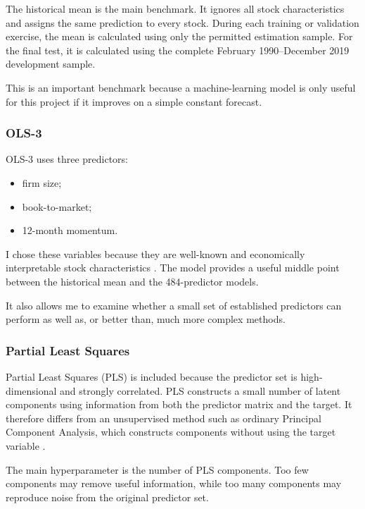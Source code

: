 \documentclass[11pt,a4paper]{article}
\begin{document}
The historical mean is the main benchmark. It ignores all stock
characteristics and assigns the same prediction to every stock. During each
training or validation exercise, the mean is calculated using only the
permitted estimation sample. For the final test, it is calculated using the
complete February 1990--December 2019 development sample.

This is an important benchmark because a machine-learning model is only useful
for this project if it improves on a simple constant forecast.

\subsubsection*{OLS-3}

OLS-3 uses three predictors:

\begin{itemize}
  \item firm size;
  \item book-to-market;
  \item 12-month momentum.
\end{itemize}

I chose these variables because they are well-known and economically
interpretable stock characteristics
\parencite{fama1992cross,jegadeesh1993returns}. The model provides a useful
middle point between the historical mean and the 484-predictor models.

It also allows me to examine whether a small set of established predictors can
perform as well as, or better than, much more complex methods.

\subsubsection*{Partial Least Squares}

Partial Least Squares (PLS) is included because the predictor set is
high-dimensional and strongly correlated. PLS constructs a small number of
latent components using information from both the predictor matrix and the
target. It therefore differs from an unsupervised method such as ordinary
Principal Component Analysis, which constructs components without using the
target variable \parencite{wold1984collinearity}.

The main hyperparameter is the number of PLS components. Too few components may
remove useful information, while too many components may reproduce noise from
the original predictor set.
\end{document}

